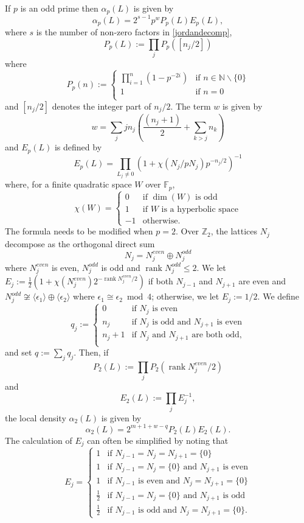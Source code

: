 \documentclass[12pt, a4paper]{article}
\newcommand{\ZZ}{\mathbb{Z}}
\newcommand{\NN}{\mathbb{N}}
\newcommand{\FF}{\mathbb{F}}
\newcommand{\la}{\langle}
\newcommand{\ra}{\rangle}
\newcommand{\opn}{\operatorname}
\newcommand{\op}{\oplus}
\begin{document}
If $p$ is an odd prime then $\alpha_p(L)$ is given by
\[
\alpha_p(L) = 2^{s-1} p^w P_p(L) E_p(L),
\]
where $s$ is the number of non-zero factors in \eqref{jordandecomp}, 
\begin{equation*}
  P_p(L) := \prod_j P_p([n_j/2]) 
\end{equation*}
where 
\[
P_p(n) := 
  \begin{cases}
    \prod_{i=1}^n (1 - p^{-2i}) & \text{if $n \in \NN \backslash \{0\}$} \\
    1 & \text{if $n=0$} \\
  \end{cases}
\]
and $[n_j/2]$ denotes the integer part of $n_j/2$.
The term $w$ is given by
\[
w = \sum_j j n_j \left ( \frac{(n_j + 1)}{2} + \sum_{k>j} n_k \right ) 
\]
and $E_p(L)$ is defined by
\begin{equation*}
  E_p(L) = \prod_{L_j \neq 0} (1 + \chi(N_j/pN_j)p^{-n_j/2})^{-1}
\end{equation*}
where, for a finite quadratic space $W$ over $\FF_p$,
\[
\chi(W) =
\begin{cases}
  0 & \text{if $\opn{dim}(W)$ is odd} \\
  1 & \text{if $W$ is a hyperbolic space} \\
  -1 & \text{otherwise.}
  \end{cases}
\]
The formula needs to be modified when $p=2$. 
Over $\ZZ_2$, the lattices $N_j$ decompose as the orthogonal direct sum
\[
N_j = N_j^{even} \op N_j^{odd}
\]
where $N_j^{even}$ is even, $N_j^{odd}$ is odd and $\opn{rank}N_j^{odd} \leq 2$.
We let $E_j := \frac{1}{2}(1 + \chi(N_j^{even})2^{- \opn{rank} N_j^{even}/2})$ if both $N_{j-1}$ and $N_{j+1}$ are even and $N_j^{odd} \not \cong \la \epsilon_1 \ra \op \la \epsilon_2 \ra$ where $\epsilon_1 \cong \epsilon_2 \bmod{ 4}$; otherwise, we let $E_j:=1/2$.
We define 
\[
  q_j := 
  \begin{cases}
    0 & \text{if $N_j$ is even} \\
    n_j & \text{if $N_j$ is odd and $N_{j+1}$ is even} \\
    n_j + 1 & \text{if $N_j$ and $N_{j+1}$ are both odd,} \\
  \end{cases}
  \]
  and set $q:=\sum_j q_j$. 
  Then, if   
\[
  P_2(L) := \prod_j P_2(\opn{rank} N_j^{even}/2)
\]
and 
\[
  E_2(L) := \prod_j E_j^{-1},
\]
the local density $\alpha_2(L)$ is given by
\begin{equation*}
  \alpha_2(L) = 2^{m+1+w-q} P_2(L) E_2(L).
\end{equation*}
The calculation of $E_j$ can often be simplified by noting that \cite{Kitaoka} 
\[
  E_j =
  \begin{cases}
    1 & \text{if $N_{j-1} = N_j = N_{j+1} = \{0\}$} \\
    1 & \text{if $N_{j-1}=N_j=\{0\}$ and $N_{j+1}$ is even} \\
    1 & \text{if $N_{j-1}$ is even and $N_j = N_{j+1} = \{0\}$} \\
    \frac{1}{2} & \text{if $N_{j-1} = N_j = \{0\}$ and $N_{j+1}$ is odd} \\
    \frac{1}{2} & \text{if $N_{j-1}$ is odd and $N_j=N_{j+1} = \{0\}$}.
  \end{cases}
\]
\end{document}
